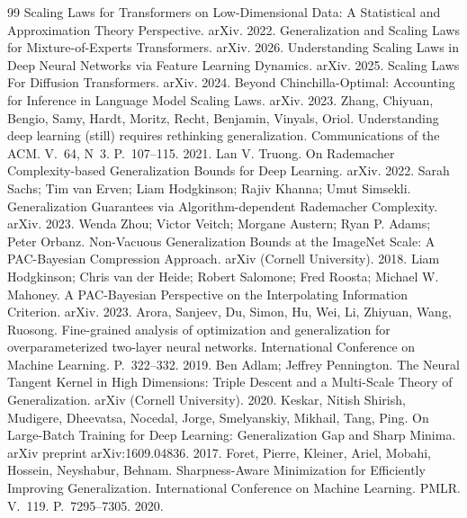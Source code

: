 \begin{thebibliography}{99}
 Scaling Laws for Transformers on Low-Dimensional Data: A Statistical and Approximation Theory Perspective. arXiv. 2022.
 Generalization and Scaling Laws for Mixture-of-Experts Transformers. arXiv. 2026.
 Understanding Scaling Laws in Deep Neural Networks via Feature Learning Dynamics. arXiv. 2025.
 Scaling Laws For Diffusion Transformers. arXiv. 2024.
 Beyond Chinchilla-Optimal: Accounting for Inference in Language Model Scaling Laws. arXiv. 2023.
 Zhang, Chiyuan, Bengio, Samy, Hardt, Moritz, Recht, Benjamin, Vinyals, Oriol. Understanding deep learning (still) requires rethinking generalization. Communications of the ACM. V.~64, N~3. P.~107--115. 2021.
 Lan V. Truong. On Rademacher Complexity-based Generalization Bounds for Deep Learning. arXiv. 2022.
 Sarah Sachs; Tim van Erven; Liam Hodgkinson; Rajiv Khanna; Umut Simsekli. Generalization Guarantees via Algorithm-dependent Rademacher Complexity. arXiv. 2023.
 Wenda Zhou; Victor Veitch; Morgane Austern; Ryan P. Adams; Peter Orbanz. Non-Vacuous Generalization Bounds at the ImageNet Scale: A PAC-Bayesian Compression Approach. arXiv (Cornell University). 2018.
 Liam Hodgkinson; Chris van der Heide; Robert Salomone; Fred Roosta; Michael W. Mahoney. A PAC-Bayesian Perspective on the Interpolating Information Criterion. arXiv. 2023.
 Arora, Sanjeev, Du, Simon, Hu, Wei, Li, Zhiyuan, Wang, Ruosong. Fine-grained analysis of optimization and generalization for overparameterized two-layer neural networks. International Conference on Machine Learning. P.~322--332. 2019.
 Ben Adlam; Jeffrey Pennington. The Neural Tangent Kernel in High Dimensions: Triple Descent and a Multi-Scale Theory of Generalization. arXiv (Cornell University). 2020.
 Keskar, Nitish Shirish, Mudigere, Dheevatsa, Nocedal, Jorge, Smelyanskiy, Mikhail, Tang, Ping. On Large-Batch Training for Deep Learning: Generalization Gap and Sharp Minima. arXiv preprint arXiv:1609.04836. 2017.
 Foret, Pierre, Kleiner, Ariel, Mobahi, Hossein, Neyshabur, Behnam. Sharpness-Aware Minimization for Efficiently Improving Generalization. International Conference on Machine Learning. PMLR. V.~119. P.~7295--7305. 2020.

\end{thebibliography}

